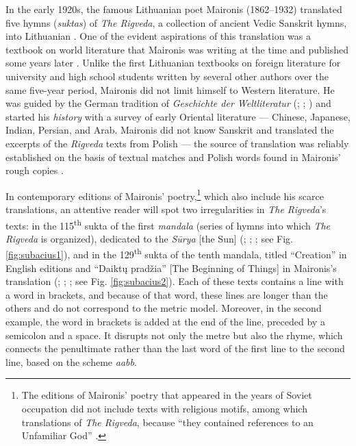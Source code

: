 \begin{paper}
In the early 1920s, the famous Lithuanian poet Maironis (1862--1932)
translated five hymns (\emph{suktas}) of \emph{The Rigveda}, a collection of
ancient Vedic Sanskrit hymns, into Lithuanian \citep{maironis_vertimai_1923}. One of
the evident aspirations of this translation was a textbook on world
literature that Maironis was writing at the time and published some
years later \citep{maironis_maironio_1926}. Unlike the first Lithuanian textbooks on
foreign literature for university and high school students written by
several other authors over the same five-year period, Maironis did not
limit himself to Western literature. He was guided by the German
tradition of \emph{Geschichte der Weltliteratur} (\citealt{baumgartner_geschichte_1897}; \citealt{wiegler_geschichte_1914};
\citealt{henschke_geschichte_1922}) and started his \emph{history} with a survey
of early Oriental literature –– Chinese, Japanese, Indian, Persian, and
Arab. Maironis did not know Sanskrit and translated the excerpts of the
\emph{Rigveda} texts from Polish \citep{michalski_czterdziesci_1912} –– the source of translation
was reliably established on the basis of textual matches and Polish
words found in Maironis' rough copies \citep[9v]{maironis_daiktu_1922}.

In contemporary editions of Maironis' poetry,\footnote{The editions
  of Maironis' poetry that appeared in the years of Soviet occupation did not include
  texts with religious motifs, among which translations of \emph{The Rigveda}, because ``they contained references to an
  Unfamiliar God'' \citep[339]{brazaitis_maironis_1957}.} which also include his scarce
translations, an attentive reader will spot two irregularities in
\emph{The Rigveda}'s texts: in the 115\textsuperscript{th}
sukta of the first \emph{mandala} (series of hymns into which \emph{The
Rigveda} is organized), dedicated to the \emph{Sūrya} {[}the Sun{]} (\citealp[232]{maironis_rastai_1987}; \citealp[235]{maironis_pavasario_2012}; \citealp[308]{maironis_pavasario_2020-1}; see Fig. \ref{fig:subacius1}), and
in the 129\textsuperscript{th} sukta of the tenth mandala, titled
``Creation'' in English editions \citep[1607]{jamison_rigveda_2014} and
``Daiktų pradžia'' {[}The Beginning of Things{]} in Maironis's
translation (\citealp[226]{maironis_rastai_1987}; \citealp[230]{maironis_pavasario_2012}; \citealp[300]{maironis_pavasario_2020-1}; see Fig. \ref{fig:subacius2}). Each of these texts contains a line with a word in
brackets, and because of that word, these lines are longer than the
others and do not correspond to the metric model. Moreover, in the
second example, the word in brackets is added at the end of the line,
preceded by a semicolon and a space. It disrupts not only the metre but
also the rhyme, which connects the penultimate rather than the last word
of the first line to the second line, based on the scheme \emph{aabb}.


\end{paper}
